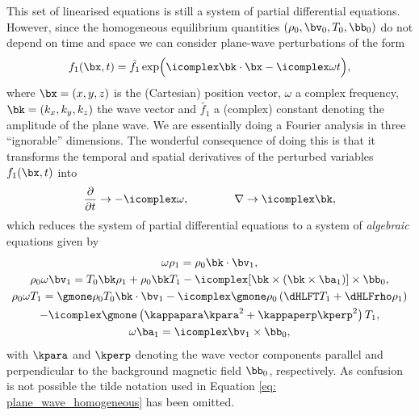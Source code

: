 This set of linearised equations is still a system of partial differential equations. However, since the homogeneous equilibrium quantities $(\rho_0, \bv_0, T_0, \bb_0)$ do not depend on time and space we can consider plane-wave perturbations of the form
\begin{equation} \label{eq: plane_wave_homogeneous}
  f_1(\bx, t) = \tilde{f_1}\exp\Bigl(\icomplex\bk \cdot \bx - \icomplex\omega t\Bigr),
\end{equation}
where $\bx = (x, y, z)$ is the (Cartesian) position vector, $\omega$ a complex frequency, $\bk = (k_x, k_y, k_z)$ the wave vector and $\tilde{f_1}$ a (complex) constant denoting the amplitude of the plane wave. We are essentially doing a Fourier analysis in three ``ignorable'' dimensions. The wonderful consequence of doing this is that it transforms the temporal and spatial derivatives of the perturbed variables $f_1(\bx, t)$ into
\begin{equation}
  \frac{\partial}{\partial t} \rightarrow -\icomplex\omega, \qquad\qquad
  \nabla \rightarrow \icomplex\bk,
\end{equation}
which reduces the system of partial differential equations to a system of \emph{algebraic} equations given by
\begin{gather}
  \omega \rho_1 = \rho_0 \bk \cdot \bv_1, \label{eq: homo_continuity_algebraic}\\
  \rho_0\omega \bv_1 = T_0 \bk \rho_1 + \rho_0\bk T_1 - \icomplex[\bk \times (\bk \times \ba_1)]\times\bb_0, \\
  \rho_0\omega T_1 =
    \gmone \rho_0T_0 \bk \cdot \bv_1
    - \icomplex\gmone\rho_0\left(\dHLFT T_1 + \dHLFrho \rho_1\right) \nonumber \\
    - \icomplex\gmone \left(\kappapara \kpara^2 + \kappaperp\kperp^2\right)T_1, \\
  \omega \ba_1 = \icomplex\bv_1 \times \bb_0, \label{eq: homo_induction_algebraic}
\end{gather}
with $\kpara$ and $\kperp$ denoting the wave vector components parallel and perpendicular to the background magnetic field $\bb_0$, respectively. As confusion is not possible the tilde notation used in Equation \eqref{eq: plane_wave_homogeneous} has been omitted.

